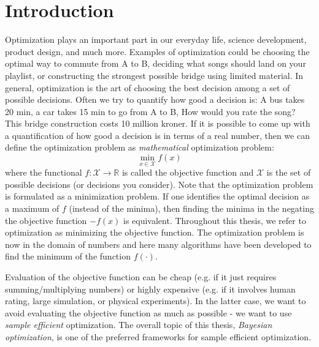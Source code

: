 \chapter{Introduction}

Optimization plays an important part in our everyday life, science development, product design, and
much more. Examples of optimization could be choosing the optimal way to commute from A to B,
deciding what songs should land on your playlist, or constructing the strongest possible bridge using
limited material. In general, optimization is the art of choosing the best decision among a set of possible
decisions. Often we try to quantify how good a decision is: A bus takes 20 min, a car takes 15 min to go from A to B, How would
you rate the song? This bridge construction costs 10 million kroner. If it is possible to come up with a
quantification of how good a decision is in terms of a real number, then we can define the optimization problem as
\textit{mathematical} optimization problem: 
$$\min_{x\in \mathcal{X}} f(x)$$ where the functional $f: \mathcal{X} \rightarrow \mathbb{R}$ is
called the objective function and $\mathcal{X}$ is the set of possible decisions (or decisions you
consider). Note that the optimization problem is formulated as a minimization problem. If one identifies
the optimal decision as a maximum of $f$ (instead of the minima), then finding the minima in the
negating the objective function $-f(x)$ is equivalent. Throughout this thesis, we refer to
optimization as minimizing the objective function. The optimization problem is now in the domain of 
numbers and here many algorithms have been developed to find the minimum of the function
$f(\cdot)$.

Evaluation of the objective function can be cheap (e.g. if it just requires summing/multiplying
numbers) or highly expensive (e.g. if it involves human rating, large simulation, or physical
experiments). In the latter case, we want to avoid evaluating the objective function as much as
possible - we want to use \textit{sample efficient} optimization. The overall topic of this
thesis, \textit{Bayesian optimization}, is one of the preferred frameworks for sample efficient optimization. 

